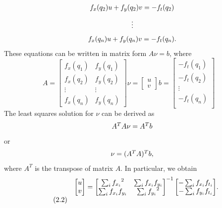 \[
\begin{array}{lc}
{\rm } & {f_x(q_2)u + f_y(q_2)v} = - f_t(q_2) \\ 
\end{array}
\]
\[
\begin{array}{lc}
{\rm } & \vdots \\ 
\end{array}
\]
\[
\begin{array}{lc}
{\rm } & {f_x(q_n)u + f_y(q_n)v} = - f_t(q_n). \\ 
\end{array}
\]
These equations can be written in matrix form $A\nu = b$, where
\[
A = \begin{bmatrix}
f_x(q_1) & f_y(q_1)\\
f_x(q_2) & f_y(q_2)\\
\vdots&\vdots\\
f_x(q_n) & f_y(q_n)
\end{bmatrix}
\nu = \begin{bmatrix}
u \\
v
\end{bmatrix}
b= \begin{bmatrix}
-f_t(q_1)\\
-f_t(q_2)\\
\vdots \\
-f_t(q_n)\\
\end{bmatrix}
\]
The least squares solution for $\nu$ can be derived as  
\[
\begin{array}{lc}
{\rm } & {A^TA\nu = A^Tb} \\ 
\end{array}
\]
or
\[
\begin{array}{lc}
{\rm } &  {\nu = (A^TA)^Tb}, \\ 
\end{array}
\]
where $A^T$ is the transpose of matrix $A$. In particular, we obtain
\[
\begin{array}{lc}
{\rm } & {  \begin{bmatrix} u \\ v \end{bmatrix} = \begin{bmatrix} \sum_{i}{f_{x_i}}^2 & \sum_{i}{f_{x_i} f_{y_i} } \\ \sum_{i}{f_{x_i} f_{y_i}} & \sum_{i}{f_{y_i}}^2 \end{bmatrix}^{-1} \begin{bmatrix} - \sum_{i}{f_{x_i} f_{t_i}} \\ - \sum_{i}{f_{y_i} f_{t_i}} \end{bmatrix}  }.\\ \tag{2.2}
\label{eq:2.2}
\end{array}
\]


